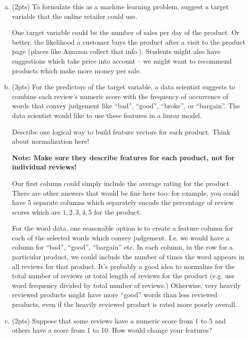 \documentclass[10pt]{article}
\begin{document}
\begin{enumerate}[(a)]
	\item (2pts) To formulate this as a machine learning problem, suggest a target variable that the online retailer could use.
	
	\color{blue}
	One target variable could be the number of sales per day of the product. Or better, the likelihood a customer buys the product after a visit to the product page (places like Amazon collect that info.). Students might also have suggestions which take price into account -- we might want to recommend products which make more money per sale. 
	\color{black}
	
	\item (3pts)  For the predictors of the target variable, a data scientist suggests to combine each review's numeric score with the frequency of occurrence of words that convey judgement like ``bad'', ``good'', ``broke'', or ``bargain''. The data scientist would like to use these features in a linear model.
	
	Describe one logical way to build feature vectors for each product. Think about normalization here!
	
	\color{blue}
	\textbf{Note: Make sure they describe features for each product, not for individual reviews!}
	
	Our first column could simply include the average rating for the product. There are other answers that would be fine here too: for example, you could have 5 separate columns which separately encode the percentage of review scores which are $1,2,3,4,5$ for the product. 
	
	For the word data, one reasonable option is to create a feature column for each of the selected words which convey judgement. I.e. we would have a column for ``bad'', ``good'', ``bargain'' etc. In each column, in the row for a particular product, we could include the number of times the word appears in all reviews for that product. It's probably a good idea to normalize for the total number of reviews or total length of reviews for the product (e.g. use word frequency divided by total number of reviews.) Otherwise, very heavily reviewed products might have more ``good'' words than less reviewed products, even if the heavily reviewed product is rated more poorly overall.
	\color{black}
		

	
	\item (2pts) Suppose that some reviews have a numeric score from 1 to 5 and others have a score from 1 to 10. How would change your features?
	

\end{enumerate}
\end{document}
